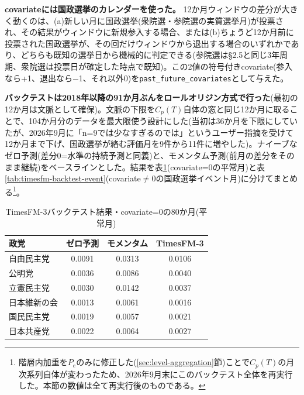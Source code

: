 \documentclass[a4paper,11pt]{ltjsarticle}
\begin{document}
\textbf{covariateには国政選挙のカレンダーを使った。} 12か月ウィンドウの差分が大きく動くのは、(a)新しい月に国政選挙(衆院選・参院選の実質選挙月)が投票され、その結果がウィンドウに新規参入する場合、または(b)ちょうど12か月前に投票された国政選挙が、その回だけウィンドウから退出する場合のいずれかであり、どちらも既知の選挙日から機械的に判定できる(参院選は\S2.5と同じ3年周期、衆院選は投票日が確定した時点で既知)。この2値の符号付きcovariate(参入なら+1、退出なら$-$1、それ以外0)を\texttt{past\_future\_covariates}として与えた。

\textbf{バックテストは2018年以降の91か月ぶんをロールオリジン方式で行った}(最初の12か月は文脈として確保)。文脈の下限を$C_p(T)$自体の窓と同じ12か月に取ることで、104か月分のデータを最大限使う設計にした(当初は36か月を下限にしていたが、2026年9月に「n=9では少なすぎるのでは」というユーザー指摘を受けて12か月まで下げ、国政選挙が絡む評価月を9件から11件に増やした)。ナイーブなゼロ予測(差分0=水準の持続予測と同義)と、モメンタム予測(前月の差分をそのまま継続)をベースラインとした。結果を表\ref{tab:timesfm-backtest-quiet}(covariate=0の平常月)と表\ref{tab:timesfm-backtest-event}(covariate$\neq$0の国政選挙イベント月)に分けてまとめる\footnote{階層内加重を$P_e$のみに修正した(\ref{sec:level-aggregation}節)ことで$C_p(T)$の月次系列自体が変わったため、2026年9月末にこのバックテスト全体を再実行した。本節の数値は全て再実行後のものである。}。

\begin{table}[h]
\centering
\small
\caption{TimesFM-3バックテスト結果・covariate=0の80か月(平常月)}
\label{tab:timesfm-backtest-quiet}
\begin{tabular}{lccc}
\toprule
政党 & ゼロ予測 & モメンタム & TimesFM-3 \\
\midrule
自由民主党 & 0.0091 & 0.0313 & 0.0106 \\
公明党 & 0.0036 & 0.0086 & 0.0040 \\
立憲民主党 & 0.0030 & 0.0142 & 0.0037 \\
日本維新の会 & 0.0013 & 0.0061 & 0.0016 \\
国民民主党 & 0.0019 & 0.0057 & 0.0021 \\
日本共産党 & 0.0022 & 0.0064 & 0.0027 \\
\bottomrule
\end{tabular}
\end{table}
\end{document}
